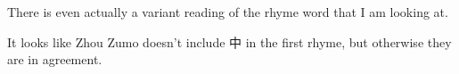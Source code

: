 \begin{longtable}{p{} p{}}





\end{longtable}


There is even actually a variant reading of the rhyme word that I am looking at. 

It looks like Zhou Zumo doesn't include 中 in the first rhyme, but otherwise they are in agreement. 








